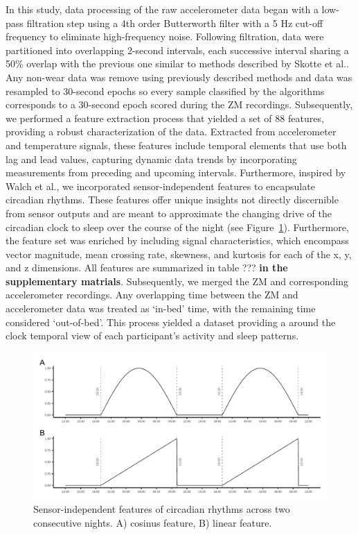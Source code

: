 \documentclass[
  super,
  preprint,
  3p]{elsarticle}
\begin{document}
In this study, data processing of the raw accelerometer data began with
a low-pass filtration step using a 4th order Butterworth filter with a 5
Hz cut-off frequency to eliminate high-frequency noise. Following
filtration, data were partitioned into overlapping 2-second intervals,
each successive interval sharing a 50\% overlap with the previous one
similar to methods described by Skotte et
al.\citep{skotte_detection_2014}. Any non-wear data was remove using
previously described methods\citep{skovgaard2023} and data was resampled
to 30-second epochs so every sample classified by the algorithms
corresponds to a 30-second epoch scored during the ZM recordings.
Subsequently, we performed a feature extraction process that yielded a
set of 88 features, providing a robust characterization of the data.
Extracted from accelerometer and temperature signals, these features
include temporal elements that use both lag and lead values, capturing
dynamic data trends by incorporating measurements from preceding and
upcoming intervals. Furthermore, inspired by Walch et
al.\citep{walch2019}, we incorporated sensor-independent features to
encapsulate circadian rhythms. These features offer unique insights not
directly discernible from sensor outputs and are meant to approximate
the changing drive of the circadian clock to sleep over the course of
the night (see Figure~\ref{fig-sensor-independent}). Furthermore, the
feature set was enriched by including signal characteristics, which
encompass vector magnitude, mean crossing rate, skewness, and kurtosis
for each of the x, y, and z dimensions. All features are summarized in
table ??? \textbf{in the supplementary matrials}. Subsequently, we
merged the ZM and corresponding accelerometer recordings. Any
overlapping time between the ZM and accelerometer data was treated as
`in-bed' time, with the remaining time considered `out-of-bed'. This
process yielded a dataset providing a around the clock temporal view of
each participant's activity and sleep patterns.

\begin{figure}[b]

{\centering \includegraphics{visuals/sensor_independent.pdf}

}

\caption{\label{fig-sensor-independent}Sensor-independent features of
circadian rhythms across two consecutive nights. A) cosinus feature, B)
linear feature.}

\end{figure}
\end{document}
